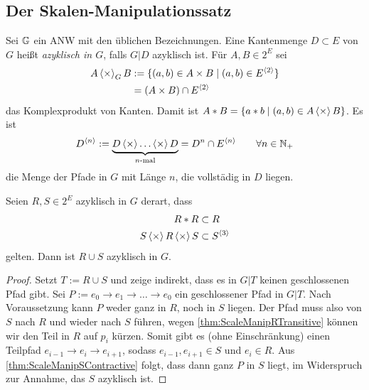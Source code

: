\subsection{Der Skalen-Manipulationssatz}

\begin{definition}
    Sei $\mathbb{G}$ ein ANW mit den üblichen Bezeichnungen.
    Eine Kantenmenge $D\subset E$ von $G$ heißt \emph{azyklisch in $G$}, falls $G|D$ azyklisch ist.
    Für $A,B\in 2^E$ sei
    \begin{align}
        A\operatorname{\langle\times\rangle}_G B
            &:= \{(a, b)\in A\times B \mid (a, b)\in E^{\langle2\rangle}\} \\
            &= (A\times B) \cap E^{\langle2\rangle} \nonumber
    \end{align}
    das Komplexprodukt von Kanten.
    Damit ist $A*B = \{a*b\mid (a, b)\in A\operatorname{\langle\times\rangle} B\}$.
    Es ist
    \[
        D^{\langle n\rangle}
            := \underbrace{D\operatorname{\langle\times\rangle} \ldots\operatorname{\langle\times\rangle} D}_{n\text{-mal}}
            = D^n \cap E^{\langle n\rangle}
            \qquad \forall n\in\mathbb{N}_{+}
    \]
    die Menge der Pfade in $G$ mit Länge $n$, die vollstädig in $D$ liegen.
\end{definition}

\begin{satz}
    Seien $R, S\in 2^E$ azyklisch in $G$ derart, dass
    \begin{align}
        R*R &\subset R \label{thm:ScaleManipRTransitive}\\
        S\operatorname{\langle\times\rangle} R\operatorname{\langle\times\rangle} S &\subset S^{\langle3\rangle} \label{thm:ScaleManipSContractive}
    \end{align}
    gelten.
    Dann ist $R\cup S$ azyklisch in $G$.
    \begin{proof}
        Setzt $T := R\cup S$ und zeige indirekt, dass es in $G|T$ keinen geschlossenen Pfad gibt.
        Sei $P := e_0\to e_1 \to \ldots \to e_0$ ein geschlossener Pfad in $G|T$.
        Nach Voraussetzung kann $P$ weder ganz in $R$, noch in $S$ liegen.
        Der Pfad muss also von $S$ nach $R$ und wieder nach $S$ führen, wegen
        \eqref{thm:ScaleManipRTransitive} können wir den Teil in $R$ auf $p_i$ kürzen.
        Somit gibt es (ohne Einschränkung) einen Teilpfad $e_{i-1} \to e_i \to e_{i+1}$, sodass $e_{i-1}, e_{i+1}\in S$ und $e_i\in R$.
        Aus \eqref{thm:ScaleManipSContractive} folgt, dass dann ganz $P$ in $S$
        liegt, im Widerspruch zur Annahme, das $S$ azyklisch ist.
    \end{proof}
\end{satz}


